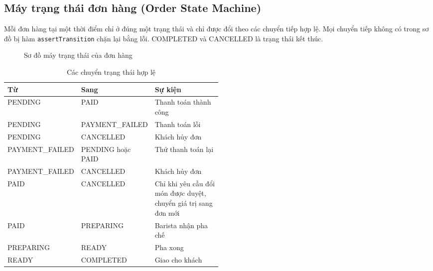 \documentclass[a4paper]{article}
\begin{document}
\subsection{Máy trạng thái đơn hàng (Order State Machine)}
Mỗi đơn hàng tại một thời điểm chỉ ở đúng một trạng thái và chỉ được đổi theo các chuyển tiếp hợp lệ. Mọi chuyển tiếp không có trong sơ đồ bị hàm \texttt{assertTransition} chặn lại bằng lỗi. COMPLETED và CANCELLED là trạng thái kết thúc.

\begin{figure}[h!]
\centering
{}
\caption{Sơ đồ máy trạng thái của đơn hàng}
\end{figure}

\begin{table}[h!]
\centering
\footnotesize
\begin{tabularx}{\textwidth}{|p{0.22\linewidth}|p{0.28\linewidth}|X|}
\hline
\textbf{Từ} & \textbf{Sang} & \textbf{Sự kiện} \\ \hline
PENDING & PAID & Thanh toán thành công \\ \hline
PENDING & PAYMENT\_FAILED & Thanh toán lỗi \\ \hline
PENDING & CANCELLED & Khách hủy đơn \\ \hline
PAYMENT\_FAILED & PENDING hoặc PAID & Thử thanh toán lại \\ \hline
PAYMENT\_FAILED & CANCELLED & Khách hủy đơn \\ \hline
PAID & CANCELLED & Chỉ khi yêu cầu đổi món được duyệt, chuyển giá trị sang đơn mới \\ \hline
PAID & PREPARING & Barista nhận pha chế \\ \hline
PREPARING & READY & Pha xong \\ \hline
READY & COMPLETED & Giao cho khách \\ \hline
\end{tabularx}
\caption{Các chuyển trạng thái hợp lệ}
\end{table}
\end{document}
